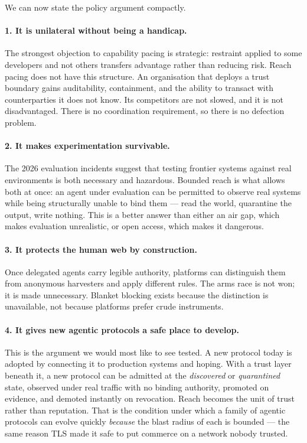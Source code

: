 \documentclass[11pt]{article}
\begin{document}
We can now state the policy argument compactly.

\paragraph{1. It is unilateral without being a handicap.}
The strongest objection to capability pacing is strategic: restraint applied to
some developers and not others transfers advantage rather than reducing risk.
Reach pacing does not have this structure. An organisation that deploys a trust
boundary gains auditability, containment, and the ability to transact with
counterparties it does not know. Its competitors are not slowed, and it is not
disadvantaged. There is no coordination requirement, so there is no defection
problem.

\paragraph{2. It makes experimentation survivable.}
The 2026 evaluation incidents suggest that testing frontier systems against real
environments is both necessary and hazardous. Bounded reach is what allows both
at once: an agent under evaluation can be permitted to observe real systems
while being structurally unable to bind them --- read the world, quarantine the
output, write nothing. This is a better answer than either an air gap, which
makes evaluation unrealistic, or open access, which makes it dangerous.

\paragraph{3. It protects the human web by construction.}
Once delegated agents carry legible authority, platforms can distinguish them
from anonymous harvesters and apply different rules. The arms race is not won; it
is made unnecessary. Blanket blocking exists because the distinction is
unavailable, not because platforms prefer crude instruments.

\paragraph{4. It gives new agentic protocols a safe place to develop.}
This is the argument we would most like to see tested. A new protocol today is
adopted by connecting it to production systems and hoping. With a trust layer
beneath it, a new protocol can be admitted at the \emph{discovered} or
\emph{quarantined} state, observed under real traffic with no binding authority,
promoted on evidence, and demoted instantly on revocation. Reach becomes the unit
of trust rather than reputation. That is the condition under which a family of
agentic protocols can evolve quickly \emph{because} the blast radius of each is
bounded --- the same reason TLS made it safe to put commerce on a network nobody
trusted.
\end{document}
